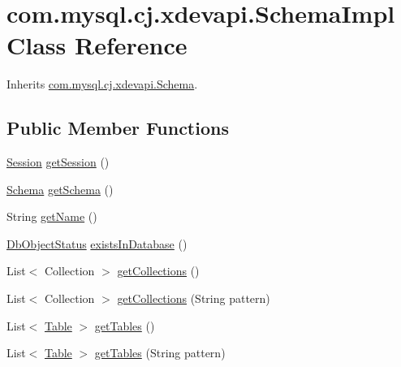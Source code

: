 \hypertarget{classcom_1_1mysql_1_1cj_1_1xdevapi_1_1_schema_impl}{}\section{com.\+mysql.\+cj.\+xdevapi.\+Schema\+Impl Class Reference}
\label{classcom_1_1mysql_1_1cj_1_1xdevapi_1_1_schema_impl}


Inherits \mbox{\hyperlink{interfacecom_1_1mysql_1_1cj_1_1xdevapi_1_1_schema}{com.\+mysql.\+cj.\+xdevapi.\+Schema}}.

\subsection*{Public Member Functions}
\begin{DoxyCompactItemize}
\item 
\mbox{\hyperlink{interfacecom_1_1mysql_1_1cj_1_1xdevapi_1_1_session}{Session}} \mbox{\hyperlink{classcom_1_1mysql_1_1cj_1_1xdevapi_1_1_schema_impl_ab09abc096390ec7f763d045636551b7f}{get\+Session}} ()
\item 
\mbox{\hyperlink{interfacecom_1_1mysql_1_1cj_1_1xdevapi_1_1_schema}{Schema}} \mbox{\hyperlink{classcom_1_1mysql_1_1cj_1_1xdevapi_1_1_schema_impl_aed68ad42cc9c13041185849537c8b791}{get\+Schema}} ()
\item 
String \mbox{\hyperlink{classcom_1_1mysql_1_1cj_1_1xdevapi_1_1_schema_impl_aab6a1ee96f0abeacc922a36da272e50d}{get\+Name}} ()
\item 
\mbox{\hyperlink{enumcom_1_1mysql_1_1cj_1_1xdevapi_1_1_database_object_1_1_db_object_status}{Db\+Object\+Status}} \mbox{\hyperlink{classcom_1_1mysql_1_1cj_1_1xdevapi_1_1_schema_impl_a587cff9708d8d6787ad6012fd0353d5f}{exists\+In\+Database}} ()
\item 
List$<$ Collection $>$ \mbox{\hyperlink{classcom_1_1mysql_1_1cj_1_1xdevapi_1_1_schema_impl_a67c63b711c361bf306149d53d1149e61}{get\+Collections}} ()
\item 
List$<$ Collection $>$ \mbox{\hyperlink{classcom_1_1mysql_1_1cj_1_1xdevapi_1_1_schema_impl_a9a4dc1d12f1d8240c4b6bc114565b191}{get\+Collections}} (String pattern)
\item 
List$<$ \mbox{\hyperlink{interfacecom_1_1mysql_1_1cj_1_1xdevapi_1_1_table}{Table}} $>$ \mbox{\hyperlink{classcom_1_1mysql_1_1cj_1_1xdevapi_1_1_schema_impl_a437e825fdc3d104e630dda918ccbfa72}{get\+Tables}} ()
\item 
List$<$ \mbox{\hyperlink{interfacecom_1_1mysql_1_1cj_1_1xdevapi_1_1_table}{Table}} $>$ \mbox{\hyperlink{classcom_1_1mysql_1_1cj_1_1xdevapi_1_1_schema_impl_ae9ce3609e108dc05f1e4ca978d490b81}{get\+Tables}} (String pattern)

\end{DoxyCompactItemize}
